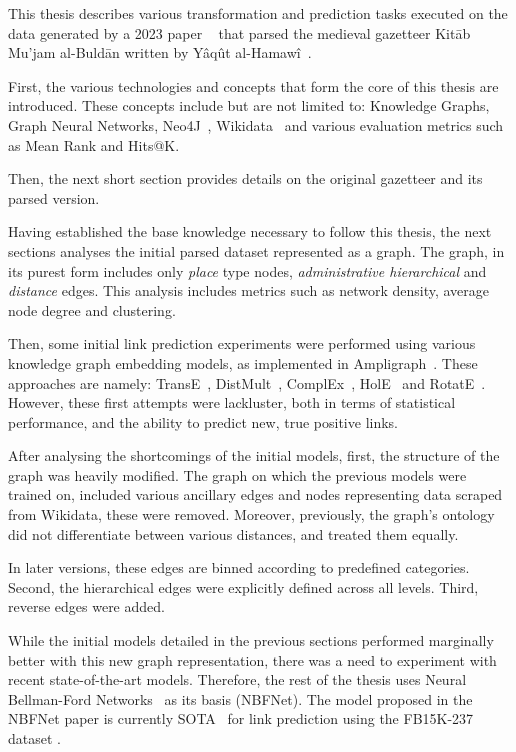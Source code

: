 This thesis describes various transformation and prediction tasks executed on the data generated by a 2023 paper ~\cite{YaqutRB}
that parsed the medieval gazetteer Kitāb Mu'jam al-Buldān written by Yâqût al-Hamawî~\cite{Yaqut}.

First, the various technologies and concepts that form the core of this thesis are introduced.
These concepts include but are not limited to: Knowledge Graphs, Graph Neural Networks, Neo4J~\cite{Neo4j}, Wikidata~\cite{Wikidata} and various
evaluation metrics such as Mean Rank and Hits@K.

Then, the next short section provides details on the original gazetteer and its parsed version.

Having established the base knowledge necessary to follow this thesis, the next sections analyses the initial parsed dataset represented as a graph.
The graph, in its purest form includes only \textit{place} type nodes,  \textit{administrative hierarchical} and \textit{distance} edges.
This analysis includes metrics such as network density, average node degree and clustering.

Then, some initial link prediction experiments were performed using various knowledge graph embedding models, as implemented in Ampligraph~\cite{ampligraph}.
These approaches are namely: TransE~\cite{TransE}, DistMult~\cite{DistMult}, ComplEx~\cite{ComplEx}, HolE~\cite{HolE} and RotatE~\cite{RotatE}.
However, these first attempts were lackluster, both in terms of statistical performance, and the ability to predict new, true positive links.

After analysing the shortcomings of the initial models, first, the structure of the graph was heavily modified.
The graph on which the previous models were trained on, included various ancillary edges and nodes representing data scraped from Wikidata, these were removed.
Moreover, previously, the graph's ontology did not differentiate between various distances, and treated them equally.

In later versions, these \text edges are binned according to predefined categories.
Second, the hierarchical edges were explicitly defined across all levels.
Third, reverse edges were added.

While the initial models detailed in the previous sections performed marginally better with this new graph representation,
there was a need to experiment with recent state-of-the-art models.
Therefore, the rest of the thesis uses Neural Bellman-Ford Networks~\cite{NBFNet} as its basis (NBFNet).
The model proposed in the NBFNet paper is currently SOTA~\cite{NBFNetSota} for link prediction using the FB15K-237 dataset .

